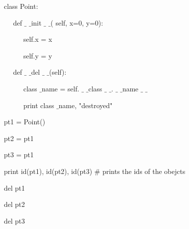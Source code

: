 {\vspace{12pt}
\noindent 
class Point: \par
\noindent 
~~ def  $  \_  $ $  \_  $init $  \_  $ $  \_  $( self, x=0, y=0): \par
\noindent 
~~~~~ self.x = x \par
\noindent 
~~~~~ self.y = y \par
\noindent 
~~ def  $  \_  $ $  \_  $del $  \_  $ $  \_  $(self): \par
\noindent 
~~~~~ class $  \_  $name = self. $  \_  $ $  \_  $class $  \_  $ $  \_  $. $  \_  $ $  \_  $name $  \_  $ $  \_  $ \par
\noindent 
~~~~~ print class $  \_  $name, "destroyed" \par
\vspace{12pt}
\noindent 
pt1 = Point() \par
\noindent 
pt2 = pt1 \par
\noindent 
pt3 = pt1 \par
\noindent 
print id(pt1), id(pt2), id(pt3)  $  \#  $ prints the ids of the obejcts \par
\noindent 
del pt1 \par
\noindent 
del pt2 \par
\noindent 
del pt3 \par
\vspace{12pt}
\vspace{12pt}
\noindent

}
